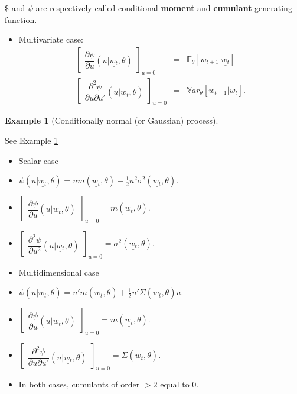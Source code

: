 \documentclass[
  12pt,
]{book}
\providecommand{\tightlist}{%
  \setlength{\itemsep}{0pt}\setlength{\parskip}{0pt}}
\theoremstyle{definition}
\theoremstyle{definition}
\newtheorem{example}{Example}[chapter]
\theoremstyle{definition}
\theoremstyle{definition}
\theoremstyle{remark}
\begin{document}
\varphi\$ and \(\psi\) are respectively called conditional \textbf{moment} and \textbf{cumulant} generating function.

\begin{itemize}
\tightlist
\item
  Multivariate case:
  \begin{eqnarray*}
  \left[\begin{array}{l}  \dfrac{\partial \psi}{\partial
  u} (u|\underline{w_t},\theta)  \end{array} \right]_{u=0} &=& \mathbb{E}_{\theta}[w_{t+1}|\underline{w_t}] \\
  \left[\begin{array}{l}  \dfrac{\partial^2
  \psi}{\partial u\partial u'} (u|\underline{w_t},\theta)  \end{array}
  \right]_{u=0} &=& \mathbb{V}ar_{\theta}[w_{t+1}|\underline{w_t}].
  \end{eqnarray*}
\end{itemize}

\begin{example}[Conditionally normal (or Gaussian) process]
\protect\hypertarget{exm:exGaussian}{}\label{exm:exGaussian}

See Example \ref{exm:exGaussian}

\begin{itemize}
\item
  Scalar case
\item
  \(\psi(u|\underline{w_t},\theta)=u m(\underline{w_t},\theta) +  \frac{1}{2}u^2\sigma^2(\underline{w_t},\theta)\).
\item
  \(\left[\begin{array}{l} \dfrac{\partial \psi}{\partial u} (u|\underline{w_t},\theta) \end{array} \right]_{u=0} = m(\underline{w_t},\theta)\).
\item
  \(\left[\begin{array}{l} \dfrac{\partial^2 \psi}{\partial u^2} (u|\underline{w_t},\theta) \end{array} \right]_{u=0} = \sigma^2(\underline{w_t},\theta)\).
\item
  Multidimensional case
\item
  \(\psi(u|\underline{w_t},\theta)=u' m(\underline{w_t},\theta) +  \frac{1}{2}u'\Sigma(\underline{w_t},\theta)u\).
\item
  \(\left[\begin{array}{l} \dfrac{\partial \psi}{\partial u} (u|\underline{w_t},\theta) \end{array} \right]_{u=0} = m(\underline{w_t},\theta)\).
\item
  \(\left[\begin{array}{l} \dfrac{\partial^2 \psi}{\partial u\partial u'} (u|\underline{w_t},\theta) \end{array} \right]_{u=0} = \Sigma(\underline{w_t},\theta)\).
\item
  In both cases, cumulants of order \(>2\) equal to \(0\).
\end{itemize}

\end{example}
\end{document}
